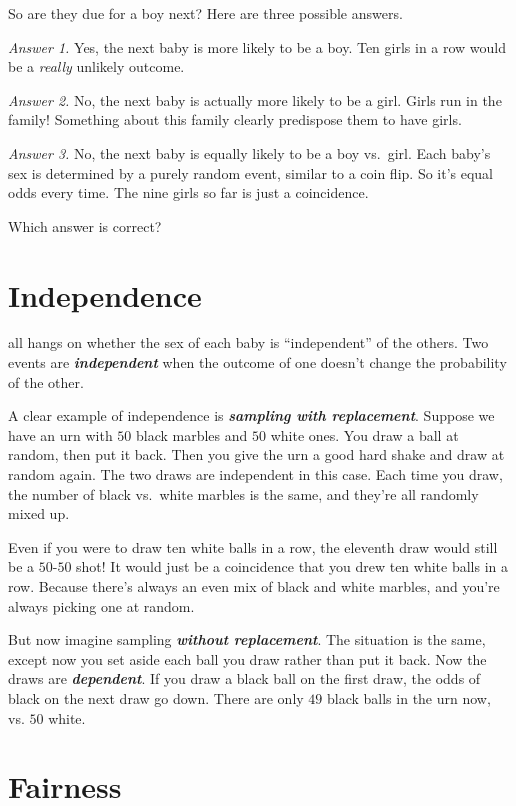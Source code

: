 \documentclass[justified]{tufte-book}
\theoremstyle{definition}
\theoremstyle{definition}
\theoremstyle{definition}
\theoremstyle{remark}
\begin{document}
So are they due for a boy next? Here are three possible answers.

\emph{Answer 1.} Yes, the next baby is more likely to be a boy. Ten
girls in a row would be a \emph{really} unlikely outcome.

\emph{Answer 2.} No, the next baby is actually more likely to be a girl.
Girls run in the family! Something about this family clearly predispose
them to have girls.

\emph{Answer 3.} No, the next baby is equally likely to be a boy
vs.~girl. Each baby's sex is determined by a purely random event,
similar to a coin flip. So it's equal odds every time. The nine girls so
far is just a coincidence.

Which answer is correct?

\hypertarget{independence}{%
\section{Independence}\label{independence}}

 all hangs on whether the sex of each baby is
``independent'' of the others. Two events are
\textbf{\emph{independent}} when the outcome of one doesn't change the
probability of the other.

A clear example of independence is \textbf{\emph{sampling with
replacement}}. Suppose we have an urn with \(50\) black marbles and
\(50\) white ones. You draw a ball at random, then put it back. Then you
give the urn a good hard shake and draw at random again. The two draws
are independent in this case. Each time you draw, the number of black
vs.~white marbles is the same, and they're all randomly mixed up.

Even if you were to draw ten white balls in a row, the eleventh draw
would still be a \(50\)-\(50\) shot! It would just be a coincidence that
you drew ten white balls in a row. Because there's always an even mix of
black and white marbles, and you're always picking one at random.

But now imagine sampling \textbf{\emph{without replacement}}. The
situation is the same, except now you set aside each ball you draw
rather than put it back. Now the draws are \textbf{\emph{dependent}}. If
you draw a black ball on the first draw, the odds of black on the next
draw go down. There are only \(49\) black balls in the urn now, vs.
\(50\) white.

\hypertarget{fairness}{%
\section{Fairness}\label{fairness}}
\end{document}
